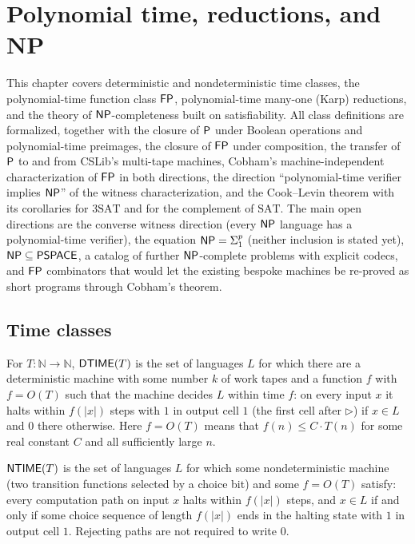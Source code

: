 \chapter{Polynomial time, reductions, and NP}
\label{chap:polytime}

This chapter covers deterministic and nondeterministic time classes, the
polynomial-time function class $\mathsf{FP}$, polynomial-time many-one (Karp)
reductions, and the theory of $\mathsf{NP}$-completeness built on satisfiability.
All class definitions are formalized, together with the closure of $\mathsf{P}$
under Boolean operations and polynomial-time preimages, the closure of $\mathsf{FP}$
under composition, the transfer of $\mathsf{P}$ to and from CSLib's multi-tape
machines, Cobham's machine-independent characterization of $\mathsf{FP}$ in both
directions, the direction ``polynomial-time verifier implies $\mathsf{NP}$'' of the
witness characterization, and the Cook--Levin theorem with its corollaries for
$3\mathrm{SAT}$ and for the complement of $\mathrm{SAT}$. The main open
directions are the converse witness direction (every $\mathsf{NP}$ language has a
polynomial-time verifier), the equation $\mathsf{NP} = \Sigma^p_1$ (neither
inclusion is stated yet), $\mathsf{NP} \subseteq \mathsf{PSPACE}$, a catalog of further
$\mathsf{NP}$-complete problems with explicit codecs, and $\mathsf{FP}$ combinators that
would let the existing bespoke machines be re-proved as short programs through
Cobham's theorem.

\section{Time classes}

\begin{definition}[$\cc{DTIME}$]
  \label{def:dtime}
  \leanok
  For $T \colon \mathbb{N} \to \mathbb{N}$, $\mathsf{DTIME}(T)$ is the set of
  languages $L$ for which there are a deterministic machine with some number
  $k$ of work tapes and a function $f$ with $f = O(T)$ such that the machine
  decides $L$ within time $f$: on every input $x$ it halts within $f(|x|)$
  steps with $1$ in output cell $1$ (the first cell after $\triangleright$) if
  $x \in L$ and $0$ there otherwise. Here $f = O(T)$ means that
  $f(n) \le C \cdot T(n)$ for some real constant $C$ and all sufficiently large
  $n$.
\end{definition}

\begin{definition}[$\cc{NTIME}$]
  \label{def:ntime}
  \leanok
  $\mathsf{NTIME}(T)$ is the set of languages $L$ for which some nondeterministic
  machine (two transition functions selected by a choice bit) and some
  $f = O(T)$ satisfy: every computation path on input $x$ halts within
  $f(|x|)$ steps, and $x \in L$ if and only if some choice sequence of length
  $f(|x|)$ ends in the halting state with $1$ in output cell $1$. Rejecting
  paths are not required to write $0$.
\end{definition}

